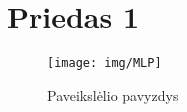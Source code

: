 \documentclass{VUMIFInfKursinis}
\begin{document}
\appendix  %

\section{Priedas 1}
\begin{figure}[H]
    \centering
    \texttt{[image: img/MLP]}
    \caption{Paveikslėlio pavyzdys}   %
    \label{img:mlp}
\end{figure}
\end{document}
